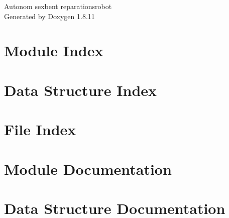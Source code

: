 \documentclass[twoside]{book}
\newcommand{\+}{\discretionary{\mbox{\scriptsize$\hookleftarrow$}}{}{}}
\newcommand{\clearemptydoublepage}{%
  \newpage{\pagestyle{empty}\cleardoublepage}%
}
\begin{document}
\hypersetup{pageanchor=false,
             bookmarksnumbered=true,
             pdfencoding=unicode
            }
\begin{titlepage}
\vspace*{7cm}
\begin{center}%
{\Large Autonom sexbent reparationsrobot }\\
\vspace*{1cm}
{\large Generated by Doxygen 1.8.11}\\
\end{center}
\end{titlepage}
\clearemptydoublepage
\tableofcontents
\clearemptydoublepage
{}
\hypersetup{pageanchor=true}

\chapter{Module Index}

\chapter{Data Structure Index}

\chapter{File Index}

\chapter{Module Documentation}

\chapter{Data Structure Documentation}















\end{document}
